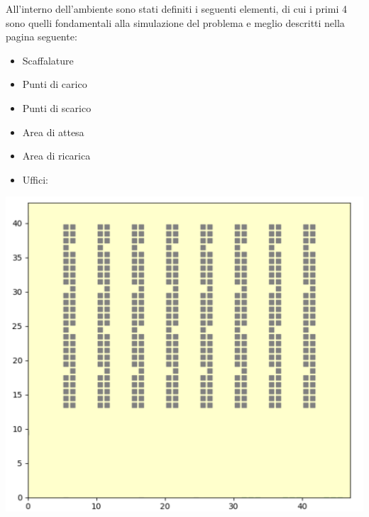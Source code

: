 \documentclass[12pt]{article}
\begin{document}
\noindent All'interno dell'ambiente sono stati definiti i seguenti elementi, di cui i primi 4 sono quelli fondamentali alla simulazione del problema e meglio descritti nella pagina seguente:

\begin{itemize}
\item Scaffalature
\item Punti di carico
\item Punti di scarico
\item Area di attesa
\item Area di ricarica
\item Uffici:
\end{itemize}
\newpage


\begin{minipage}[ht]{0.45\linewidth}
\label{ambienteSimulatore}
\centering
\includegraphics[width=\textwidth]{Figures/Map/Corsie.png}
\end{minipage}
\hspace{0.5cm}
\end{document}
